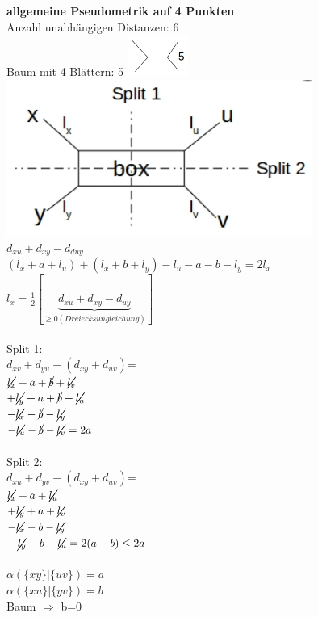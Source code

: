 \textbf{allgemeine Pseudometrik auf 4 Punkten}\\
Anzahl unabhängigen Distanzen: 6\\
Baum mit 4 Blättern: 5
\includegraphics[width=0.15\textwidth]{lectures/161216/pix/4.jpg}\\
\includegraphics[width=0.75\textwidth]{lectures/161216/pix/5.jpg}\\
$d_{xu} + d_{xy} - d_{duy}$\\
$(l_x+a+l_u)+(l_x+b+l_y)-l_u-a-b-l_y=2l_x$\\
$l_x=\frac{1}{2}[\underbrace{d_{xu}+d_{xy}-d_{uy}}_{\geq 0 (Dreiecksungleichung)}]$\\\\
Split 1:\\
$d_{xv}+d_{yu}-(d_{xy}+d_{uv})$=\\
$\cancel{l_x}+a+\cancel{b}+\cancel{l_v}$\\
$+\cancel{l_y}+a+\cancel{b}+\cancel{l_u}$\\
$-\cancel{l_x}-\cancel{b}-\cancel{l_y}$\\
$-\cancel{l_u}-\cancel{b}-\cancel{l_v}=2a$\\\\
Split 2:\\
$d_{xu}+d_{yv}-(d_{xy}+d_{uv})$=\\
$\cancel{l_x}+a+\cancel{l_u}$\\
$+\cancel{l_y}+a+\cancel{l_v}$\\
$-\cancel{l_x}-b-\cancel{l_y}$\\
$-\cancel{l_y}-b-\cancel{l_u}=2(a-b) \leq 2a$\\\\

$\alpha(\{xy\}|\{uv\})=a$\\
$\alpha(\{xu\}|\{yv\})=b$\\
Baum $\Rightarrow$ b=0

